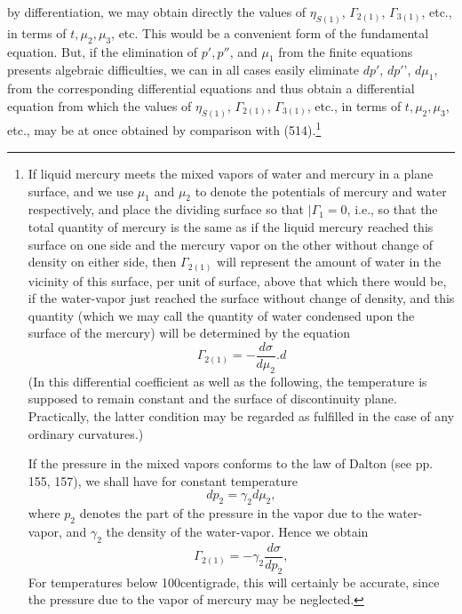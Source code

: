 \documentclass[12pt]{article}
\begin{document}
{by differentiation, we may obtain directly the values of $\eta_{S(1)}$, $\Gamma_{2(1)}$, $\Gamma_{3(1)}$, etc., in terms of $t, \mu_2,\mu_3$, etc. This would be a convenient form of the fundamental equation. But, if the elimination of $p', p''$, and $\mu_1$ from the finite equations presents algebraic difficulties, we can in all cases easily eliminate $dp'$, $dp'$', $d\mu_1$, from the corresponding differential equations and thus obtain a differential equation        from which the values of $\eta_{S(1)}$, $\Gamma_{2(1)}$, $\Gamma_{3(1)}$, etc., in terms of $t, \mu_2,\mu_3$, etc., may be at once obtained by comparison with (514).\footnote{If liquid mercury meets the mixed vapors of water and mercury in a plane surface, and we use $\mu_1$ and $\mu_2$ to denote the potentials of mercury and water respectively, and place the dividing surface so that $|\Gamma_1=0$, i.e., so that the total quantity of mercury is the same as if the liquid mercury reached this surface on one side and the mercury vapor on the other without change of density on either side, then $\Gamma_{2(1)}$ will represent the amount of water in the vicinity of this surface, per unit of surface, above that which there would be, if the water-vapor just reached the surface without change of density, and this quantity (which we may call the quantity of water condensed upon the surface of the mercury) will be determined by the equation
$$ \Gamma_{2(1)} = -\frac{d\sigma}{d\mu_2}.                d$$
(In this differential coefficient as well as the following, the temperature is supposed to remain constant and the surface of discontinuity plane. Practically, the latter condition may be regarded as fulfilled in the case of any ordinary curvatures.)\par
If the pressure in the mixed vapors conforms to the law of Dalton (see pp. 155, 157), we shall have for constant temperature
$$ dp_2= \gamma_2 d\mu_2,$$
where $p_2$ denotes the part of the pressure in the vapor due to the water-vapor, and $\gamma_2 $ the density of the water-vapor. Hence we obtain
$$ \Gamma_{2(1)} = - \gamma_2 \frac{d\sigma}{dp_2},$$
For temperatures below 100\degree  centigrade, this will certainly be accurate, since the pressure due to the vapor of mercury may be neglected.\par
}}
\end{document}
